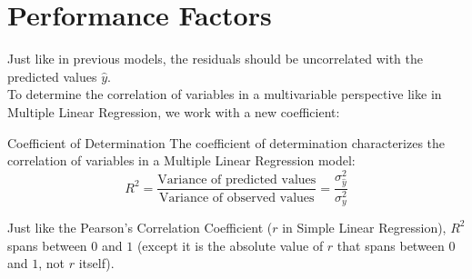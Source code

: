 \section{Performance Factors}
Just like in previous models, the residuals should be uncorrelated with the predicted values $\hat{y}$. \\
To determine the correlation of variables in a multivariable perspective like in Multiple Linear Regression, we work with a new coefficient:
\begin{ln-define}{Coefficient of Determination}{}
    The coefficient of determination characterizes the correlation of variables in a Multiple Linear Regression model:
    \[R^2 = \frac{\text{Variance of predicted values}}{\text{Variance of observed values}} = \frac{\sigma_{\hat{y}}^2}{\sigma_y^2}\]
\end{ln-define}
Just like the Pearson's Correlation Coefficient ($r$ in Simple Linear Regression), $R^2$ spans between $0$ and $1$ (except it is the absolute value of $r$ that spans between $0$ and $1$, not $r$ itself).
